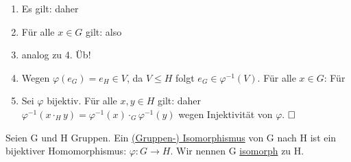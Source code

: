 \documentclass{../../meta/tudscript}
\begin{document}
        \begin{enumerate}
            \item Es gilt: 
            daher 
        
            \item Für alle $x \in G$ gilt:
            also 

            \item analog zu 4. Üb!
            
            \item Wegen $\varphi (e_G) = e_H \in V$, da $V \leq H$ folgt $e_G \in
            \varphi^{-1} (V)$.
            Für alle $x \in G$:
            Für 

            \item Sei $\varphi$ bijektiv. Für alle $x, y \in H$ gilt:
            daher $\varphi^{-1} (x \cdot_H  y) = \varphi^{-1} (x) \cdot_G \varphi^{-1} (y)$ wegen Injektivität von $\varphi$.
            $\hfill\square$  
        \end{enumerate}

            Seien G und H Gruppen. Ein \underline{(Gruppen-) Isomorphismus} von G nach H ist ein 
            bijektiver Homomorphismus: $\varphi: G \rightarrow H$. Wir nennen G \underline{isomorph} zu H.
       
\end{document}
